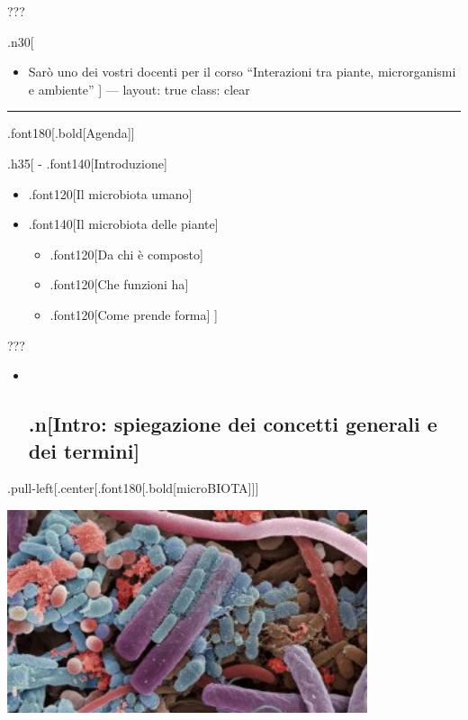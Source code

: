 \documentclass[
]{article}
\providecommand{\tightlist}{%
  \setlength{\itemsep}{0pt}\setlength{\parskip}{0pt}}
\begin{document}
???

.n30{[}

\begin{itemize}
\tightlist
\item
  Sarò uno dei vostri docenti per il corso ``Interazioni tra piante,
  microrganismi e ambiente'' {]} --- layout: true class: clear
\end{itemize}

\begin{center}\rule{0.5\linewidth}{0.5pt}\end{center}

.font180{[}.bold{[}Agenda{]}{]}

.h35{[} - .font140{[}Introduzione{]}

\begin{itemize}
\item
  .font120{[}Il microbiota umano{]}
\item
  .font140{[}Il microbiota delle piante{]}

  \begin{itemize}
  \item
    .font120{[}Da chi è composto{]}
  \item
    .font120{[}Che funzioni ha{]}
  \item
    .font120{[}Come prende forma{]} {]}
  \end{itemize}
\end{itemize}

???

\begin{itemize}
\item ~
  \hypertarget{nintro-spiegazione-dei-concetti-generali-e-dei-termini}{%
  \subsection{\texorpdfstring{.n{[}\textbf{Intro}: spiegazione dei
  concetti generali e dei
  termini{]}}{.n{[}Intro: spiegazione dei concetti generali e dei termini{]}}}\label{nintro-spiegazione-dei-concetti-generali-e-dei-termini}}
\end{itemize}

.pull-left{[}.center{[}.font180{[}.bold{[}microBIOTA{]}{]}{]}

\begin{center}\includegraphics[width=400px]{images/microbiota} \end{center}
\end{document}
